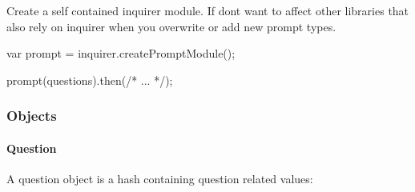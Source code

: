 Create a self contained inquirer module. If don\textquotesingle{}t want to affect other libraries that also rely on inquirer when you overwrite or add new prompt types.


\begin{DoxyCode}
var prompt = inquirer.createPromptModule();

prompt(questions).then(/* ... */);
\end{DoxyCode}


\subsubsection*{Objects}

\label{_objects}%


\paragraph*{Question}

\label{_questions}%
 A question object is a {\ttfamily hash} containing question related values\+:


